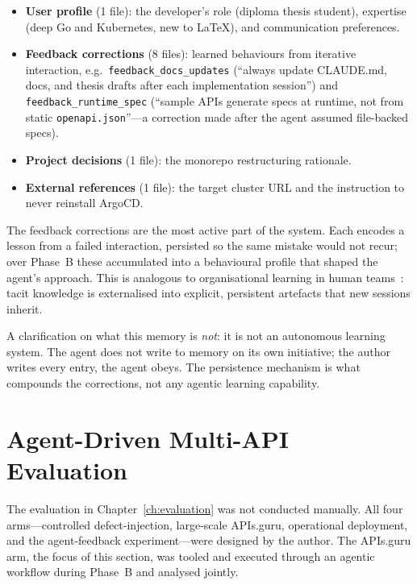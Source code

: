 \begin{itemize}
    \item \textbf{User profile} (1 file): the developer's role (diploma thesis student), expertise (deep Go and Kubernetes, new to LaTeX), and communication preferences.
    \item \textbf{Feedback corrections} (8 files): learned behaviours from iterative interaction, e.g.\ \texttt{feedback\_docs\_updates} (``always update CLAUDE.md, docs, and thesis drafts after each implementation session'') and \texttt{feedback\_runtime\_spec} (``sample APIs generate specs at runtime, not from static \texttt{openapi.json}''---a correction made after the agent assumed file-backed specs).
    \item \textbf{Project decisions} (1 file): the monorepo restructuring rationale.
    \item \textbf{External references} (1 file): the target cluster URL and the instruction to never reinstall ArgoCD.
\end{itemize}

The feedback corrections are the most active part of the system. Each encodes a lesson from a failed interaction, persisted so the same mistake would not recur; over Phase~B these accumulated into a behavioural profile that shaped the agent's approach. This is analogous to organisational learning in human teams~\cite{nonaka-knowledge}: tacit knowledge is externalised into explicit, persistent artefacts that new sessions inherit.

A clarification on what this memory is \emph{not}: it is not an autonomous learning system. The agent does not write to memory on its own initiative; the author writes every entry, the agent obeys. The persistence mechanism is what compounds the corrections, not any agentic learning capability.

\section{Agent-Driven Multi-API Evaluation}
\label{sec:agent-eval}

The evaluation in Chapter~\ref{ch:evaluation} was not conducted manually. All four arms---controlled defect-injection, large-scale APIs.guru, operational deployment, and the agent-feedback experiment---were designed by the author. The APIs.guru arm, the focus of this section, was tooled and executed through an agentic workflow during Phase~B and analysed jointly.

